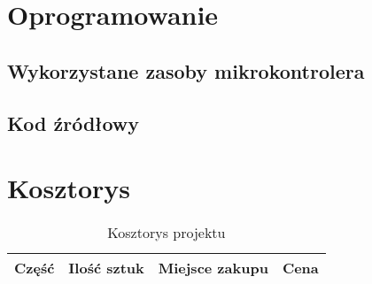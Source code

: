\documentclass{article}
\begin{document}
\section{Oprogramowanie}
\subsection{Wykorzystane zasoby mikrokontrolera}

\subsection{Kod źródłowy}

\section{Kosztorys}
\begin{table}[H]
\centering
\begin{tabular}{lccc}
\toprule
Część & Ilość sztuk & Miejsce zakupu & Cena \\
\midrule
\bottomrule
\end{tabular}
\caption{Kosztorys projektu}
\end{table}
\end{document}
